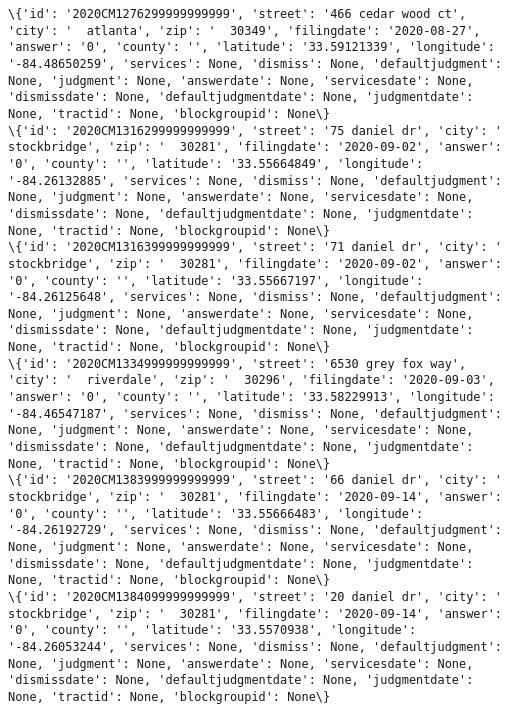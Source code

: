 \documentclass[11pt]{article}
\begin{document}
\begin{Verbatim}[commandchars=\\\{\}]
\{'id': '2020CM1276299999999999', 'street': '466 cedar wood ct', 'city': '  atlanta', 'zip': '  30349', 'filingdate': '2020-08-27', 'answer': '0', 'county': '', 'latitude': '33.59121339', 'longitude': '-84.48650259', 'services': None, 'dismiss': None, 'defaultjudgment': None, 'judgment': None, 'answerdate': None, 'servicesdate': None, 'dismissdate': None, 'defaultjudgmentdate': None, 'judgmentdate': None, 'tractid': None, 'blockgroupid': None\}
\{'id': '2020CM1316299999999999', 'street': '75 daniel dr', 'city': '  stockbridge', 'zip': '  30281', 'filingdate': '2020-09-02', 'answer': '0', 'county': '', 'latitude': '33.55664849', 'longitude': '-84.26132885', 'services': None, 'dismiss': None, 'defaultjudgment': None, 'judgment': None, 'answerdate': None, 'servicesdate': None, 'dismissdate': None, 'defaultjudgmentdate': None, 'judgmentdate': None, 'tractid': None, 'blockgroupid': None\}
\{'id': '2020CM1316399999999999', 'street': '71 daniel dr', 'city': '  stockbridge', 'zip': '  30281', 'filingdate': '2020-09-02', 'answer': '0', 'county': '', 'latitude': '33.55667197', 'longitude': '-84.26125648', 'services': None, 'dismiss': None, 'defaultjudgment': None, 'judgment': None, 'answerdate': None, 'servicesdate': None, 'dismissdate': None, 'defaultjudgmentdate': None, 'judgmentdate': None, 'tractid': None, 'blockgroupid': None\}
\{'id': '2020CM1334999999999999', 'street': '6530 grey fox way', 'city': '  riverdale', 'zip': '  30296', 'filingdate': '2020-09-03', 'answer': '0', 'county': '', 'latitude': '33.58229913', 'longitude': '-84.46547187', 'services': None, 'dismiss': None, 'defaultjudgment': None, 'judgment': None, 'answerdate': None, 'servicesdate': None, 'dismissdate': None, 'defaultjudgmentdate': None, 'judgmentdate': None, 'tractid': None, 'blockgroupid': None\}
\{'id': '2020CM1383999999999999', 'street': '66 daniel dr', 'city': '  stockbridge', 'zip': '  30281', 'filingdate': '2020-09-14', 'answer': '0', 'county': '', 'latitude': '33.55666483', 'longitude': '-84.26192729', 'services': None, 'dismiss': None, 'defaultjudgment': None, 'judgment': None, 'answerdate': None, 'servicesdate': None, 'dismissdate': None, 'defaultjudgmentdate': None, 'judgmentdate': None, 'tractid': None, 'blockgroupid': None\}
\{'id': '2020CM1384099999999999', 'street': '20 daniel dr', 'city': '  stockbridge', 'zip': '  30281', 'filingdate': '2020-09-14', 'answer': '0', 'county': '', 'latitude': '33.5570938', 'longitude': '-84.26053244', 'services': None, 'dismiss': None, 'defaultjudgment': None, 'judgment': None, 'answerdate': None, 'servicesdate': None, 'dismissdate': None, 'defaultjudgmentdate': None, 'judgmentdate': None, 'tractid': None, 'blockgroupid': None\}

\end{Verbatim}
\end{document}
